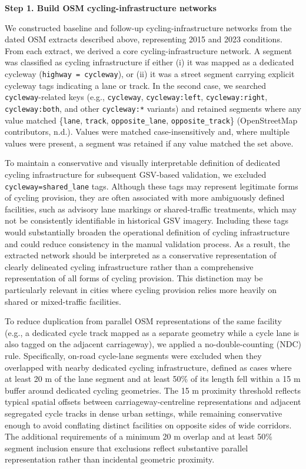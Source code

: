 \documentclass[
]{article}
\begin{document}
\textbf{Step 1. Build OSM cycling-infrastructure networks}

We constructed baseline and follow-up cycling-infrastructure networks
from the dated OSM extracts described above, representing 2015 and 2023
conditions. From each extract, we derived a core cycling-infrastructure
network. A segment was classified as cycling infrastructure if either
(i) it was mapped as a dedicated cycleway
(\texttt{highway\ =\ cycleway}), or (ii) it was a street segment
carrying explicit cycleway tags indicating a lane or track. In the
second case, we searched \texttt{cycleway}-related keys (e.g.,
\texttt{cycleway}, \texttt{cycleway:left}, \texttt{cycleway:right},
\texttt{cycleway:both}, and other \texttt{cycleway:*} variants) and
retained segments where any value matched \{\texttt{lane},
\texttt{track}, \texttt{opposite\_lane}, \texttt{opposite\_track}\}
(OpenStreetMap contributors, n.d.). Values were matched
case-insensitively and, where multiple values were present, a segment
was retained if any value matched the set above.

\color{blue}To maintain a conservative and visually interpretable
definition of dedicated cycling infrastructure for subsequent GSV-based
validation, we excluded \texttt{cycleway=shared\_lane} tags. Although
these tags may represent legitimate forms of cycling provision, they are
often associated with more ambiguously defined facilities, such as
advisory lane markings or shared-traffic treatments, which may not be
consistently identifiable in historical GSV imagery. Including these
tags would substantially broaden the operational definition of cycling
infrastructure and could reduce consistency in the manual validation
process. As a result, the extracted network should be interpreted as a
conservative representation of clearly delineated cycling infrastructure
rather than a comprehensive representation of all forms of cycling
provision. This distinction may be particularly relevant in cities where
cycling provision relies more heavily on shared or mixed-traffic
facilities.\color{black}

To reduce duplication from parallel OSM representations of the same
facility (e.g., a dedicated cycle track mapped as a separate geometry
while a cycle lane is also tagged on the adjacent carriageway), we
applied a no-double-counting (NDC) rule. Specifically, on-road
cycle-lane segments were excluded when they overlapped with nearby
dedicated cycling infrastructure, defined as cases where at least 20 m
of the lane segment and at least 50\% of its length fell within a 15 m
buffer around dedicated cycling geometries. The 15 m proximity threshold
reflects typical spatial offsets between carriageway-centreline
representations and adjacent segregated cycle tracks in dense urban
settings, while remaining conservative enough to avoid conflating
distinct facilities on opposite sides of wide corridors. The additional
requirements of a minimum 20 m overlap and at least 50\% segment
inclusion ensure that exclusions reflect substantive parallel
representation rather than incidental geometric proximity.
\end{document}
